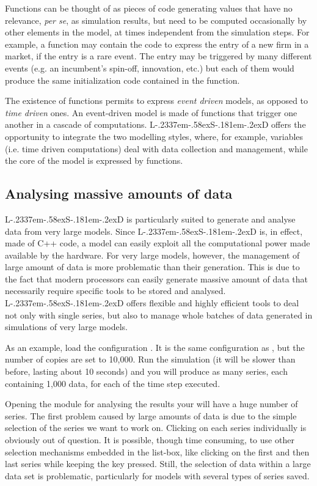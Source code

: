 \documentclass [11pt,a4paper] {book}
\def\LsD{{L\kern-.2337em\lower-.58ex\hbox{S}\kern-.181em\lower-.2ex\hbox{D}}\xspace}
\begin{document}
Functions can be thought of as pieces of code generating values that have no relevance, \textit{per se}, as simulation results, but need to be computed occasionally by other elements in the model, at times independent from the simulation steps. For example, a function may contain the code to express the entry of a new firm in a market, if the entry is a rare event. The entry may be triggered by many different events (e.g. an incumbent's spin-off, innovation, etc.) but each of them would produce the same initialization code contained in the function.

The existence of functions permits to express \textit{event driven} models, as opposed to \textit{time driven} ones. An event-driven model is made of functions that trigger one another in a cascade of computations. \LsD offers the opportunity to integrate the two modelling styles, where, for example, variables (i.e. time driven computations) deal with data collection and management, while the core of the model is expressed by functions.

  
\subsection{Analysing massive amounts of data}

\LsD is particularly suited to generate and analyse data from very large models. Since \LsD is, in effect, made of C++ code, a model can easily exploit all the computational power made available by the hardware. For very large models, however, the management of large amount of data is more problematic than their generation. This is due to the fact that modern processors can easily generate massive amount of data that necessarily require specific tools to be stored and analysed. \LsD offers flexible and highly efficient tools to deal not only with single series, but also to manage whole batches of data generated in simulations of very large models.

As an example, load the configuration . It is the same configuration as , but the number of  copies are set to 10,000. Run the simulation (it will be slower than before, lasting about 10 seconds) and you will produce as many series, each containing 1,000 data, for each of the time step executed.

Opening the module for analysing the results your will have a huge number of series.  The first problem caused by large amounts of data is due to the simple selection of the series we want to work on. Clicking on each series individually is obviously out of question. It is possible, though time consuming, to use other selection mechanisms embedded in the list-box, like clicking on the first and then last series while keeping the key  pressed. Still, the selection of data within a large data set is problematic, particularly for models with several types of series saved.
\end{document}
